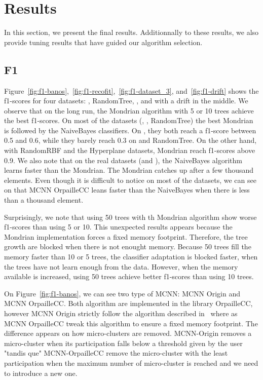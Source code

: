 \section{Results}
In this section, we present the final results. Additionnally to these results,
we also provide tuning results that have guided our algorithm selection.

\subsection{F1}
Figure~\ref{fig:f1-banos},~\ref{fig:f1-recofit},~\ref{fig:f1-dataset_3},
and~\ref{fig:f1-drift} shows the f1-scores for four datasets: \banosdataset,
RandomTree, \recofitdataset, and \banosdataset with a drift in the middle.  We
observe that on the long run, the Mondrian algorithm with 5 or 10 trees achieve
the best f1-scores.  On most of the datasets (\banosdataset, \recofitdataset,
RandomTree) the best Mondrian is followed by the NaiveBayes classifiers.  On
\banosdataset, they both reach a f1-score between 0.5 and 0.6, while they
barely reach 0.3 on \recofitdataset and RandomTree. On the other hand, with
RandomRBF and the Hyperplane datasets, Mondrian reach f1-scores above 0.9.  We
also note that on the real datasets (\banosdataset and \recofitdataset), the
NaiveBayes algorithm learns faster than the Mondrian. The Mondrian catches up
after a few thousand elements. Even though it is difficult to notice on most of
the datasets, we can see on \banosdataset that MCNN OrpailleCC leans faster
than the NaiveBayes when there is less than a thousand element.

Surprisingly, we note that using 50 trees with th Mondrian algorithm show worse
f1-scores than using 5 or 10. This unexpected results appears because the
Mondrian implementation forces a fixed memory footprint. Therefore, the tree
growth are blocked when there is not enought memory. Because 50 trees fill the
memory faster than 10 or 5 trees, the classifier adaptation is blocked faster,
when the trees have not learn enough from the data. However, when the memory
available is increased, using 50 trees achieve better f1-scores than using 10
trees.

On Figure~\ref{fig:f1-banos}, we can see two type of MCNN: MCNN Origin and MCNN
OrpailleCC. Both algorithm are implemented in the library OrpailleCC, however
MCNN Origin strictly follow the algorithm described in~\cite{mc-nn} where as
MCNN OrpailleCC tweak this algorithm to ensure a fixed memory footprint. The
difference appears on how micro-clusters are removed. MCNN-Origin removes a
micro-cluster when its participation falls below a threshold given by the user
"tandis que" MCNN-OrpailleCC remove the micro-cluster with the least
participation when the maximum number of micro-cluster is reached and we need
to introduce a new one.

